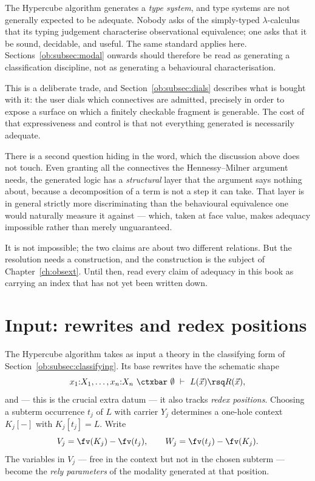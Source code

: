 \begin{remark}
\label{ob:rem:no-adequacy}
The Hypercube algorithm generates a \emph{type system}, and type systems are not
generally expected to be adequate. Nobody asks of the simply-typed $\lambda$-calculus
that its typing judgement characterise observational equivalence; one asks that it be
sound, decidable, and useful. The same standard applies here. Sections~\ref{ob:subsec:modal}
onwards should therefore be read as generating a classification discipline, not as
generating a behavioural characterisation.
\end{remark}

This is a deliberate trade, and Section~\ref{ob:subsec:dials} describes what is bought with
it: the user dials which connectives are admitted, precisely in order to expose a surface
on which a finitely checkable fragment is generable. The cost of that expressiveness and
control is that not everything generated is necessarily adequate.

\begin{remark}
\label{ob:rem:adequate-for-what}
There is a second question hiding in the word, which the discussion above does not
touch. Even granting all the connectives the Hennessy--Milner argument needs, the
generated logic has a \emph{structural} layer that the argument says nothing about,
because a decomposition of a term is not a step it can take. That layer is in
general strictly more discriminating than the behavioural equivalence one would
naturally measure it against --- which, taken at face value, makes adequacy
impossible rather than merely unguaranteed.

It is not impossible; the two claims are about two different relations. But the
resolution needs a construction, and the construction is the subject of
Chapter~\ref{ch:obsext}. Until then, read every claim of adequacy in this book as
carrying an index that has not yet been written down.
\end{remark}

\section{Input: rewrites and redex positions}

The Hypercube algorithm takes as input a theory in the classifying form of
Section~\ref{ob:subsec:classifying}. Its base rewrites have the schematic shape
\[
  x_1{:}X_1, \dots, x_n{:}X_n \ \ctxbar\ \emptyset \ \vdash\ L(\vec x) \rsq R(\vec x) ,
\]
and --- this is the crucial extra datum --- it also tracks \emph{redex positions}.
Choosing a subterm occurrence $t_j$ of $L$ with carrier $Y_j$ determines a one-hole
context $K_j[-]$ with $K_j[t_j] = L$. Write
\[
  V_j = \fv(K_j) - \fv(t_j), \qquad W_j = \fv(t_j) - \fv(K_j) .
\]
The variables in $V_j$ --- free in the context but not in the chosen subterm --- become
the \emph{rely parameters} of the modality generated at that position.

